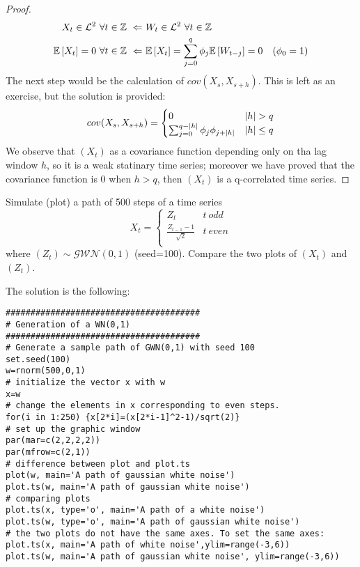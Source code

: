 \begin{proof}
    \begin{equation*}
        \begin{split}
            X_t\in\el{2}\ \forall t\in\Z\ \Leftarrow&\ W_t\in\el{2}\ \forall t\in\Z\\
            \expect{X_t}=0\ \forall t\in\Z\ \Leftarrow&\ \expect{X_t}=\sum_{j=0}^q\phi_j\expect{W_{t-j}}=0\ \ \ (\phi_0=1)
        \end{split}
    \end{equation*}
    The next step would be the calculation of $cov(X_s,X_{s+h})$. This is left as an exercise, but the solution is provided:
    \begin{equation*}
        cov(X_s,X_{s+h})=\begin{cases}
            0 & \abs{h}>q\\
            \sum_{j=0}^{q-\abs{h}}\phi_j\phi_{j+\abs{h}} & \abs{h}\le q
        \end{cases}
    \end{equation*}
    We observe that $(X_t)$ as a covariance function depending only on tha lag window $h$, so it is a weak statinary time series; moreover we have proved that the covariance function is 0 when $h>q$, then $(X_t)$ is a q-correlated time series. 
\end{proof}

\begin{example}
    Simulate (plot) a path of 500 steps of a time series
    \begin{equation*}
        X_t=\begin{cases}
            Z_t & t\ odd\\
            \frac{Z_{t-1}-1}{\sqrt{2}} & t\ even\\
        \end{cases}
    \end{equation*}
    where $(Z_t)\sim\mathcal{GWN}(0,1)$ (seed=100). Compare the two plots of $(X_t)$ and $(Z_t)$.
    
    The solution is the following:
    \begin{verbatim}
#######################################
# Generation of a WN(0,1)
#######################################
# Generate a sample path of GWN(0,1) with seed 100
set.seed(100)
w=rnorm(500,0,1)
# initialize the vector x with w
x=w
# change the elements in x corresponding to even steps.
for(i in 1:250) {x[2*i]=(x[2*i-1]^2-1)/sqrt(2)}
# set up the graphic window
par(mar=c(2,2,2,2))
par(mfrow=c(2,1))
# difference between plot and plot.ts
plot(w, main='A path of gaussian white noise')
plot.ts(w, main='A path of gaussian white noise')
# comparing plots
plot.ts(x, type='o', main='A path of a white noise')
plot.ts(w, type='o', main='A path of gaussian white noise')
# the two plots do not have the same axes. To set the same axes:
plot.ts(x, main='A path of white noise',ylim=range(-3,6))
plot.ts(w, main='A path of gaussian white noise', ylim=range(-3,6))
    \end{verbatim}
\end{example}

